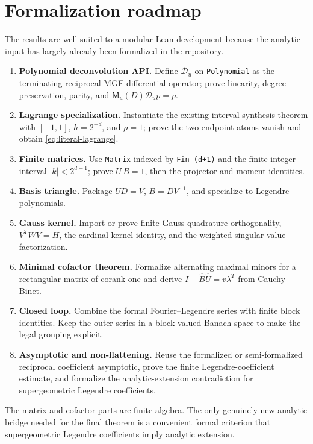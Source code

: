 \documentclass[11pt]{article}
\theoremstyle{definition}
\theoremstyle{remark}
\newcommand{\MM}{\mathsf M}
\newcommand{\Dscr}{\mathscr D_{u}}
\begin{document}
\section{Formalization roadmap}
\label{sec:formalization}

The results are well suited to a modular Lean development because the analytic
input has largely already been formalized in the repository.

\begin{enumerate}
  \item \textbf{Polynomial deconvolution API.}  Define $\Dscr$ on
  \texttt{Polynomial} as the terminating reciprocal-MGF differential
  operator; prove linearity, degree preservation, parity, and
  $\MM_u(D)\Dscr p=p$.
  \item \textbf{Lagrange specialization.}  Instantiate the existing interval
  synthesis theorem with $[-1,1]$, $h=2^{-d}$, and $\rho=1$; prove the two
  endpoint atoms vanish and obtain \eqref{eq:literal-lagrange}.
  \item \textbf{Finite matrices.}  Use \texttt{Matrix} indexed by
  \texttt{Fin (d+1)} and the finite integer interval $|k|<2^{d+1}$; prove
  $U\,B=1$, then the projector and moment identities.
  \item \textbf{Basis triangle.}  Package $UD=V$, $B=DV^{-1}$, and specialize
  to Legendre polynomials.
  \item \textbf{Gauss kernel.}  Import or prove finite Gauss quadrature
  orthogonality, $V^TWV=H$, the cardinal kernel identity, and the weighted
  singular-value factorization.
  \item \textbf{Minimal cofactor theorem.}  Formalize alternating maximal
  minors for a rectangular matrix of corank one and derive
  $I-\widehat B\widehat U=v\lambda^T$ from Cauchy--Binet.
  \item \textbf{Closed loop.}  Combine the formal Fourier--Legendre series
  with finite block identities.  Keep the outer series in a block-valued
  Banach space to make the legal grouping explicit.
  \item \textbf{Asymptotic and non-flattening.}  Reuse the formalized or
  semi-formalized reciprocal coefficient asymptotic, prove the finite
  Legendre-coefficient estimate, and formalize the analytic-extension
  contradiction for supergeometric Legendre coefficients.
\end{enumerate}

The matrix and cofactor parts are finite algebra.  The only genuinely new
analytic bridge needed for the final theorem is a convenient formal criterion
that supergeometric Legendre coefficients imply analytic extension.
\end{document}
